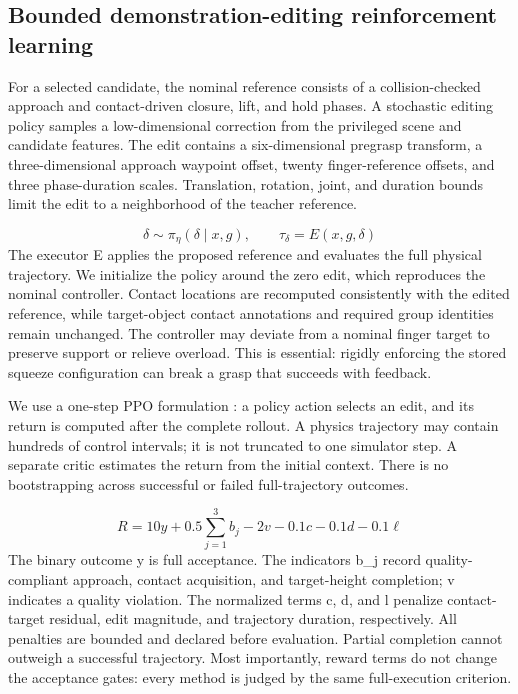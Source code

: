 \documentclass[letterpaper,10pt,conference]{ieeeconf}
\begin{document}
\subsection{Bounded demonstration-editing reinforcement learning}
For a selected candidate, the nominal reference consists of a collision-checked approach and contact-driven closure, lift, and hold phases. A stochastic editing policy samples a low-dimensional correction from the privileged scene and candidate features. The edit contains a six-dimensional pregrasp transform, a three-dimensional approach waypoint offset, twenty finger-reference offsets, and three phase-duration scales. Translation, rotation, joint, and duration bounds limit the edit to a neighborhood of the teacher reference.

\begin{equation}
\delta\sim\pi_\eta(\delta\mid x,g),\qquad \tau_\delta=E(x,g,\delta)
\label{eq:editing}
\end{equation}
The executor E applies the proposed reference and evaluates the full physical trajectory. We initialize the policy around the zero edit, which reproduces the nominal controller. Contact locations are recomputed consistently with the edited reference, while target-object contact annotations and required group identities remain unchanged. The controller may deviate from a nominal finger target to preserve support or relieve overload. This is essential: rigidly enforcing the stored squeeze configuration can break a grasp that succeeds with feedback.

We use a one-step PPO formulation \cite{demofungrasp}: a policy action selects an edit, and its return is computed after the complete rollout. A physics trajectory may contain hundreds of control intervals; it is not truncated to one simulator step. A separate critic estimates the return from the initial context. There is no bootstrapping across successful or failed full-trajectory outcomes.

\begin{equation}
R=10y+0.5\sum_{j=1}^{3}b_j-2v-0.1c-0.1d-0.1\ell
\label{eq:reward}
\end{equation}
The binary outcome y is full acceptance. The indicators b\_j record quality-compliant approach, contact acquisition, and target-height completion; v indicates a quality violation. The normalized terms c, d, and l penalize contact-target residual, edit magnitude, and trajectory duration, respectively. All penalties are bounded and declared before evaluation. Partial completion cannot outweigh a successful trajectory. Most importantly, reward terms do not change the acceptance gates: every method is judged by the same full-execution criterion.
\end{document}
